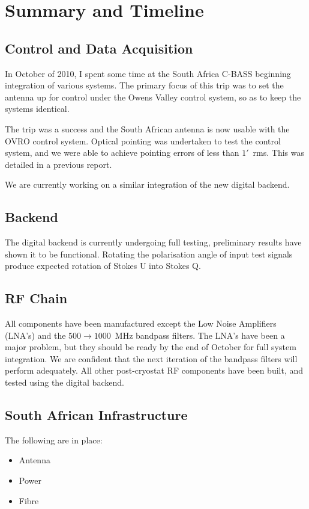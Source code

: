 \section{Summary and Timeline}

\subsection{Control and Data Acquisition}
In October of 2010, I spent some time at the South Africa C-BASS beginning integration of various systems. The primary focus of this trip was to set the antenna up for control under the Owens Valley control system, so as to keep the systems identical. 

The trip was a success and the South African antenna is now usable with the OVRO control system. Optical pointing was undertaken to test the control system, and we were able to achieve pointing errors of less than $1'$~rms. This was detailed in a previous report. 

We are currently working on a similar integration of the new digital backend.

\subsection{Backend}

The digital backend is currently undergoing full testing, preliminary results have shown it to be functional. Rotating the polarisation angle of input test signals produce expected rotation of Stokes U into Stokes Q. 

\subsection{RF Chain}
All components have been manufactured except the Low Noise Amplifiers (LNA's) and the $500\rightarrow1000$~MHz bandpass filters. The LNA's have been a major problem, but they should be ready by the end of October for full system integration. We are confident that the next iteration of the bandpass filters will perform adequately. All other post-cryostat RF components have been built, and tested using the digital backend.

\subsection{South African Infrastructure}
The following are in place:
\begin{itemize}
 \item Antenna
 \item Power
 \item Fibre
\end{itemize}

